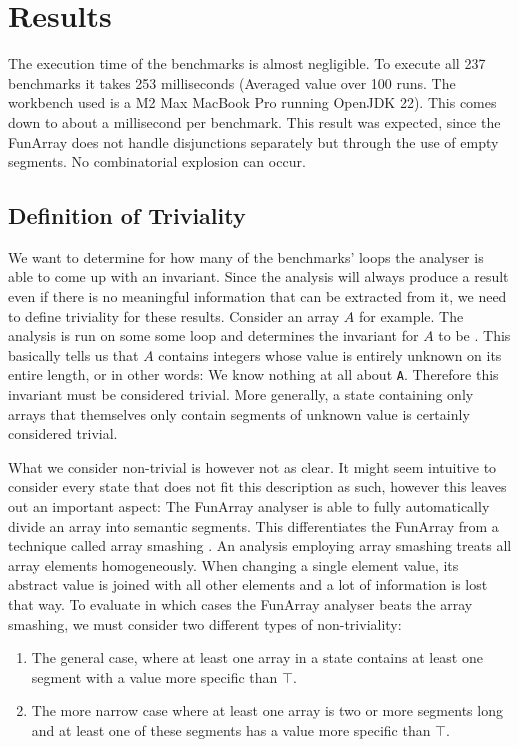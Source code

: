 \section{Results}

The execution time of the benchmarks is almost negligible. To execute all 237 benchmarks it takes 253 milliseconds (Averaged value over 100 runs. The workbench used is a M2 Max MacBook Pro running OpenJDK 22). This comes down to about a millisecond per benchmark. This result was expected, since the FunArray does not handle disjunctions separately but through the use of empty segments. No combinatorial explosion can occur.

\subsection{Definition of Triviality}

We want to determine for how many of the benchmarks' loops the analyser is able to come up with an invariant. Since the analysis will always produce a result even if there is no meaningful information that can be extracted from it, we need to define triviality for these results. Consider an array $A$ for example. The analysis is run on some some loop and determines the invariant for $A$ to be . This basically tells us that $A$ contains integers whose value is entirely unknown on its entire length, or in other words: We know nothing at all about \texttt{A}. Therefore this invariant must be considered trivial. More generally, a state containing only arrays that themselves only contain segments of unknown value is certainly considered trivial.

What we consider non-trivial is however not as clear. It might seem intuitive to consider every state that does not fit this description as such, however this leaves out an important aspect: The FunArray analyser is able to fully automatically divide an array into semantic segments. This differentiates the FunArray from a technique called array smashing \cite{cousot2011}. An analysis employing array smashing treats all array elements homogeneously. When changing a single element value, its abstract value is joined with all other elements and a lot of information is lost that way. To evaluate in which cases the FunArray analyser beats the array smashing, we must consider two different types of non-triviality:

\begin{enumerate}
	\item The general case, where at least one array in a state contains at least one segment with a value more specific than $\top$.
	\item The more narrow case where at least one array is two or more segments long and at least one of these segments has a value more specific than $\top$.
\end{enumerate}

